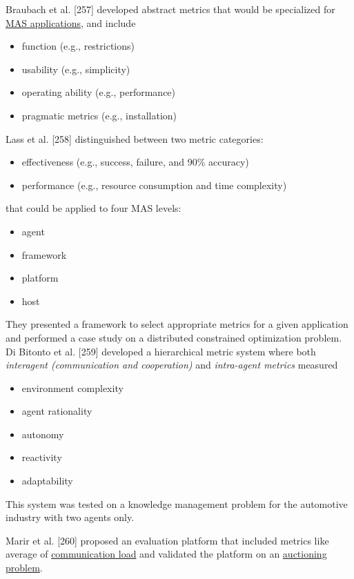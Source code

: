 \documentclass{article}
\begin{document}
					Braubach et al. \citet{rizk-2018-decision-making-in-multiagent-systems-a-survey}[257] developed abstract metrics that would be specialized for \underline{MAS applications}, and include 
					\begin{itemize}
						\item function (e.g., restrictions)
						\item usability (e.g., simplicity)
						\item operating ability (e.g., performance)
						\item pragmatic metrics (e.g., installation)
					\end{itemize}
				
					Lass et al. \citet{rizk-2018-decision-making-in-multiagent-systems-a-survey}[258] distinguished between two metric categories: 
					\begin{itemize}
						\item effectiveness (e.g., success, failure, and 90\% accuracy)
						\item performance (e.g., resource consumption and time complexity)
					\end{itemize}
					that could be applied to four MAS levels:
					\begin{itemize}
						\item agent
						\item framework
						\item platform
						\item host
					\end{itemize}
					They presented a framework to select appropriate metrics for a given application and performed a case study on a distributed constrained optimization problem. 
					Di Bitonto et al.  \citet{rizk-2018-decision-making-in-multiagent-systems-a-survey}[259] developed a hierarchical metric system where both \textit{interagent (communication and cooperation)} and \textit{intra-agent metrics} measured 
					\begin{itemize}
						\item environment complexity
						\item agent rationality
						\item autonomy
						\item reactivity
						\item adaptability
					\end{itemize}
					This system was tested on a knowledge management problem for the automotive industry with two agents only. 
					
					Marir et al. \citet{rizk-2018-decision-making-in-multiagent-systems-a-survey}[260] proposed an evaluation platform that included metrics like average of \underline{communication load} and validated the platform on an \underline{auctioning problem}. 
					
\end{document}
